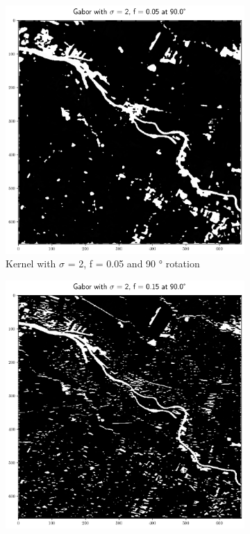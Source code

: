 \documentclass[a4paper, english]{article}
\begin{document}
\begin{figure}[!htbp]
     \begin{subfigure}[b]{0.3\textwidth}
         \centering
         \includegraphics[width=\textwidth]{img/Features_2_005_90.png}
         \caption{Kernel with $\sigma$ = 2, f = 0.05 and 90 ° rotation}\label{fig:feat04}
     \end{subfigure}
     \hfill
     \begin{subfigure}[b]{0.3\textwidth}
         \centering
         \includegraphics[width=\textwidth]{img/Features_2_015_90.png}

\end{subfigure}
\end{figure}
\end{document}
